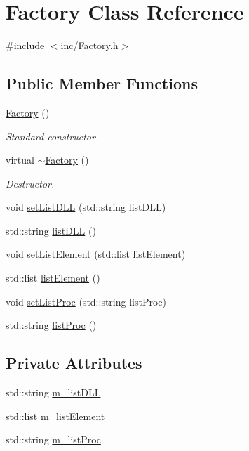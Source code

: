 \hypertarget{classFactory}{
\section{Factory Class Reference}
\label{classFactory}
}


{\ttfamily \#include $<$inc/Factory.h$>$}\subsection*{Public Member Functions}
\begin{DoxyCompactItemize}
\item 
\hyperlink{classFactory_ac792bf88cfb7b6804b479529da5308cc}{Factory} ()
\begin{DoxyCompactList}\small\item\em Standard constructor. \item\end{DoxyCompactList}\item 
virtual \hyperlink{classFactory_abb3d73c23bef3ca95487856ef0d7c476}{$\sim$Factory} ()
\begin{DoxyCompactList}\small\item\em Destructor. \item\end{DoxyCompactList}\item 
void \hyperlink{classFactory_a0f10adde2d57c8a1d07fdb4557f3ac3b}{setListDLL} (std::string listDLL)
\item 
std::string \hyperlink{classFactory_a21cd37e4b21b06e574cf67faea08782a}{listDLL} ()
\item 
void \hyperlink{classFactory_a7bc368f81d0228931a44b41b27c39b53}{setListElement} (std::list listElement)
\item 
std::list \hyperlink{classFactory_aca9a1442c4ee2f17ea27db723ce65d90}{listElement} ()
\item 
void \hyperlink{classFactory_afdec7fe6e79da3e5748d33f740333671}{setListProc} (std::string listProc)
\item 
std::string \hyperlink{classFactory_afb222fc976d624fa6fdcb30f0aca586c}{listProc} ()
\end{DoxyCompactItemize}
\subsection*{Private Attributes}
\begin{DoxyCompactItemize}
\item 
std::string \hyperlink{classFactory_a266167ae49fcf4fa9baa5485dea4b062}{m\_\-listDLL}
\item 
std::list \hyperlink{classFactory_a83a99d80105fab2371ce03230b90e8a3}{m\_\-listElement}
\item 
std::string \hyperlink{classFactory_aec20c1d0a1ef175f55a82e868edabe88}{m\_\-listProc}
\end{DoxyCompactItemize}


